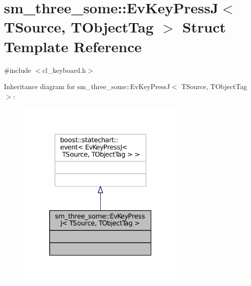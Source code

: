 \hypertarget{structsm__three__some_1_1EvKeyPressJ}{}\section{sm\+\_\+three\+\_\+some\+:\+:Ev\+Key\+PressJ$<$ T\+Source, T\+Object\+Tag $>$ Struct Template Reference}
\label{structsm__three__some_1_1EvKeyPressJ}


{\ttfamily \#include $<$cl\+\_\+keyboard.\+h$>$}



Inheritance diagram for sm\+\_\+three\+\_\+some\+:\+:Ev\+Key\+PressJ$<$ T\+Source, T\+Object\+Tag $>$\+:
\nopagebreak
\begin{figure}[H]
\begin{center}
\leavevmode
\includegraphics[width=235pt]{structsm__three__some_1_1EvKeyPressJ__inherit__graph}
\end{center}
\end{figure}


